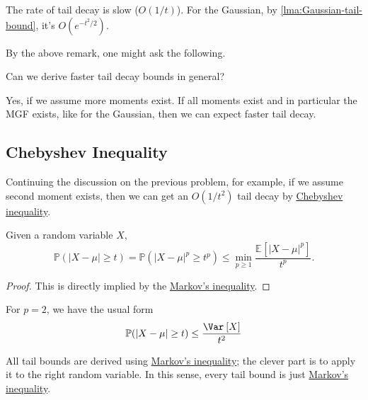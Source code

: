 \begin{remark}
  The rate of tail decay is slow (\(O(1 / t)\)). For the Gaussian, by \autoref{lma:Gaussian-tail-bound}, it's \(O(e^{-t^2 / 2})\).
\end{remark}

By the above remark, one might ask the following.

\begin{problem*}
  Can we derive faster tail decay bounds in general?
\end{problem*}
\begin{answer}
  Yes, if we assume more moments exist. If all moments exist and in particular the MGF exists, like for the Gaussian, then we can expect faster tail decay.
\end{answer}

\subsection{Chebyshev Inequality}
Continuing the discussion on the previous problem, for example, if we assume second moment exists, then we can get an \(O(1 / t^2)\) tail decay by \hyperref[lma:Chebyshev-inequality]{Chebyshev inequality}.

\begin{lemma}\label{lma:Chebyshev-inequality}
  Given a random variable \(X\),
  \[
    \mathbb{P} (\vert X - \mu  \vert \geq t ) = \mathbb{P} (\vert X - \mu  \vert^p \geq t ^p) \leq \min _{p \geq 1} \frac{\mathbb{E}_{}\left[\vert X-\mu  \vert^p \right] }{t^p}.
  \]
\end{lemma}
\begin{proof}
  This is directly implied by the \hyperref[lma:Markov-inequality]{Markov's inequality}.
\end{proof}

\begin{remark}
  For \(p = 2\), we have the usual form
  \[
    \mathbb{P} (\vert X - \mu  \vert \geq t) \leq \frac{\Var_{}\left[X \right] }{t^2}
  \]
\end{remark}

\begin{remark}
  All tail bounds are derived using \hyperref[lma:Markov-inequality]{Markov's inequality}; the clever part is to apply it to the right random variable. In this sense, every tail bound is just \hyperref[lma:Markov-inequality]{Markov's inequality}.
\end{remark}


